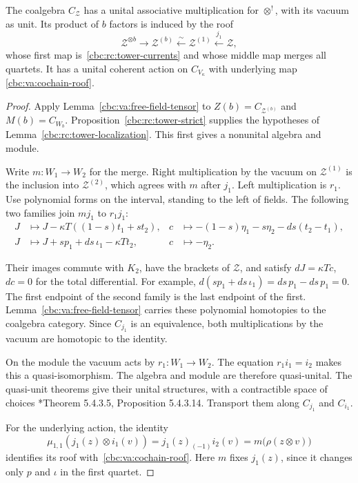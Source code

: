 \begin{theorem}\label{cbc:rc:cochain-monoid}
The coalgebra $C_{\mathcal Z}$ has a unital associative
multiplication for $\otimes^!$, with its vacuum as unit.
Its product of $b$ factors is induced by the roof
\[
 \mathcal Z^{\otimes b}\longrightarrow\mathcal Z^{(b)}
 \xleftarrow{\sim}\mathcal Z^{(1)}\xleftarrow{j_1}\mathcal Z,
\]
whose first map is~\eqref{cbc:rc:tower-currents} and whose
middle map merges all quartets. It has a unital coherent action
on $C_{V_\kappa}$ with underlying map
\eqref{cbc:va:cochain-roof}.
\end{theorem}
\begin{proof}
Apply Lemma~\ref{cbc:va:free-field-tensor} to
$Z(b)=C_{\mathcal Z^{(b)}}$ and $M(b)=C_{W_b}$.
Proposition~\ref{cbc:rc:tower-strict} supplies the hypotheses
of Lemma~\ref{cbc:rc:tower-localization}. This first gives
a nonunital algebra and module.

Write $m:W_1\to W_2$ for the merge. Right multiplication by
the vacuum on $\mathcal Z^{(1)}$ is the inclusion into
$\mathcal Z^{(2)}$, which agrees with $m$ after $j_1$.
Left multiplication is $r_1$. Use polynomial forms on the
interval, standing to the left of fields. The following two
families join $mj_1$ to $r_1j_1$:
\begin{align}
 J&\longmapsto J-\kappa T((1-s)t_1+st_2),
 &c&\longmapsto-(1-s)\eta_1-s\eta_2-ds(t_2-t_1),
 \label{cbc:rc:left-unit-one}\\
 J&\longmapsto J+sp_1+ds\,\iota_1-\kappa Tt_2,
 &c&\longmapsto-\eta_2.
 \label{cbc:rc:left-unit-two}
\end{align}

Their images commute with $K_2$, have the brackets of
$\mathcal Z$, and satisfy $dJ=\kappa Tc$, $dc=0$ for the
total differential. For example,
$d(sp_1+ds\,\iota_1)=ds\,p_1-ds\,p_1=0$.
The first endpoint of the second family is the last endpoint
of the first. Lemma~\ref{cbc:va:free-field-tensor} carries
these polynomial homotopies to the coalgebra category.
Since $C_{j_1}$ is an equivalence, both multiplications by the
vacuum are homotopic to the identity.

On the module the vacuum acts by $r_1:W_1\to W_2$.
The equation $r_1i_1=i_2$ makes this a quasi-isomorphism.
The algebra and module are therefore quasi-unital. The
quasi-unit theorems give their unital structures, with a
contractible space of choices
\cite{LurieHA}*{Theorem 5.4.3.5, Proposition 5.4.3.14}.
Transport them along $C_{j_1}$ and $C_{i_1}$.

For the underlying action, the identity
\[
 \mu_{1,1}(j_1(z)\otimes i_1(v))
   =j_1(z)_{(-1)}i_2(v)=m\bigl(\rho(z\otimes v)\bigr)
\]
identifies its roof with~\eqref{cbc:va:cochain-roof}.
Here $m$ fixes $j_1(z)$, since it changes only $p$ and
$\iota$ in the first quartet.
\end{proof}

